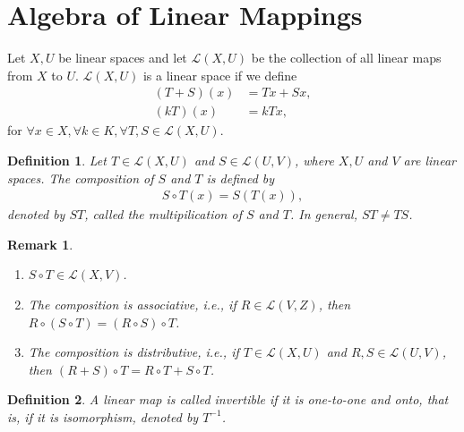 \documentclass[10pt]{book}
\newtheorem{definition}{Definition}[chapter]
\newtheorem{remark}{Remark}[chapter]
\theoremstyle{definition}
\numberwithin{equation}{chapter}
\begin{document}
\medskip

\section{Algebra of Linear Mappings}
Let $X,U$ be linear spaces and let $\mathscr{L}(X,U)$ be the collection of all linear maps from $X$ to $U$. $\mathscr{L}(X,U)$ is a linear space if we define
\begin{align*}
    (T+S)(x) & = Tx + Sx, \\
    (kT)(x) & = k T x,
\end{align*}
for $\forall x\in X, \forall k\in K, \forall T,S\in \mathscr{L}(X,U)$.

\medskip

\begin{definition}
Let $T\in \mathscr{L}(X,U)$ and $S\in \mathscr{L}(U,V)$, where $X,U$ and $V$ are linear spaces. The composition of $S$ and $T$ is defined by 
\begin{align*}
    S \circ T(x) = S\left(T(x)\right),
\end{align*}
denoted by $ST$, called the multipilication of $S$ and $T$. In general, $ST\neq TS$.
\end{definition}
\begin{remark}
~\begin{enumerate}[label=(\arabic*)]
    \item $S\circ T \in \mathscr{L}(X,V)$.
    \item The composition is associative, i.e., if $R\in \mathscr{L}(V,Z)$, then $R\circ (S\circ T) = (R\circ S)\circ T$.
    \item The composition is distributive, i.e., if $T\in \mathscr{L}(X,U)$ and $R,S \in \mathscr{L}(U,V)$, then $(R+S)\circ T = R\circ T + S\circ T$.
\end{enumerate}
\end{remark}

\medskip

\begin{definition}
A linear map is called invertible if it is one-to-one and onto, that is, if it is isomorphism, denoted by $T^{-1}$.
\end{definition}

\medskip
\end{document}
